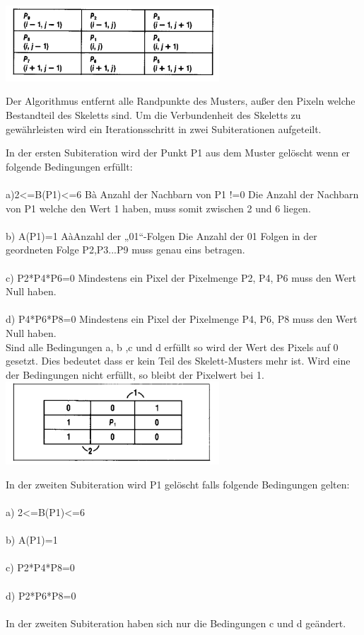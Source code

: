 \documentclass[
	12pt,
	a4paper,
	BCOR10mm,
	DIV14,
	listof=totoc,
	bibliography=totoc,
	headsepline
]{scrreprt}
\begin{document}
\includegraphics[width=8cm]{Res/PixelNachbarschaft.png}


Der Algorithmus entfernt alle Randpunkte des Musters, außer den Pixeln welche Bestandteil des Skeletts sind. Um die Verbundenheit des Skeletts zu gewährleisten wird ein  Iterationsschritt in zwei Subiterationen aufgeteilt.

In der ersten Subiteration wird der Punkt P1 aus dem Muster gelöscht wenn er folgende Bedingungen erfüllt:\\ \\
a)2<=B(P1)<=6     
Bà Anzahl der Nachbarn von P1 !=0
Die Anzahl der Nachbarn von P1 welche den Wert 1 haben, muss somit zwischen 2 und 6 liegen.\\ \\
b) A(P1)=1
AàAnzahl der „01“-Folgen 
Die Anzahl der 01 Folgen in der geordneten Folge P2,P3...P9 muss genau eins betragen.\\ \\
c) P2*P4*P6=0  
Mindestens ein Pixel der Pixelmenge P2, P4, P6 muss den Wert Null haben.\\ \\
d) P4*P6*P8=0
Mindestens ein Pixel der Pixelmenge P4, P6, P8 muss den Wert Null haben.
\\

Sind alle Bedingungen a, b ,c und d erfüllt so wird der Wert des Pixels auf 0 gesetzt.
Dies bedeutet dass er kein Teil des Skelett-Musters mehr ist.
Wird eine der Bedingungen nicht erfüllt, so bleibt der Pixelwert bei 1.\\

\includegraphics[width=8cm]{Res/01Folgen.png}


In der zweiten Subiteration wird P1 gelöscht falls folgende Bedingungen gelten: \\ \\
a) 2<=B(P1)<=6 \\ \\
b) A(P1)=1 \\ \\
c) P2*P4*P8=0 \\ \\
d) P2*P6*P8=0 \\ \\
In der zweiten Subiteration haben sich nur die Bedingungen c und d geändert.\\
\end{document}
